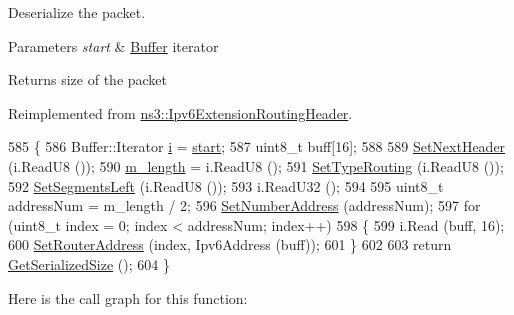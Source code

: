 Deserialize the packet. 


\begin{DoxyParams}{Parameters}
{\em start} & \hyperlink{classns3_1_1Buffer}{Buffer} iterator \\
\hline
\end{DoxyParams}
\begin{DoxyReturn}{Returns}
size of the packet 
\end{DoxyReturn}


Reimplemented from \hyperlink{classns3_1_1Ipv6ExtensionRoutingHeader_aa1084222d3efdae9d445ff8a5b00322a}{ns3\+::\+Ipv6\+Extension\+Routing\+Header}.


\begin{DoxyCode}
585 \{
586   Buffer::Iterator \hyperlink{bernuolliDistribution_8m_a6f6ccfcf58b31cb6412107d9d5281426}{i} = \hyperlink{namespacevisualizer_1_1core_a2a35e5d8a34af358b508dac8635754e0}{start};
587   uint8\_t buff[16];
588 
589   \hyperlink{classns3_1_1Ipv6ExtensionHeader_a750a50791b7710a151ea61dad7063256}{SetNextHeader} (i.ReadU8 ());
590   \hyperlink{classns3_1_1Ipv6ExtensionHeader_aebd490c06dfde17f84b92baa3349afc8}{m\_length} = i.ReadU8 ();
591   \hyperlink{classns3_1_1Ipv6ExtensionRoutingHeader_a227281f25a92273d206b284fea5ef410}{SetTypeRouting} (i.ReadU8 ());
592   \hyperlink{classns3_1_1Ipv6ExtensionRoutingHeader_ac5b62f0810ca16780c26d00f4da4b83f}{SetSegmentsLeft} (i.ReadU8 ());
593   i.ReadU32 ();
594 
595   uint8\_t addressNum = m\_length / 2;
596   \hyperlink{classns3_1_1Ipv6ExtensionLooseRoutingHeader_afbd5a9612a1eb9d45c5a5c6cf0eb746a}{SetNumberAddress} (addressNum);
597   \textcolor{keywordflow}{for} (uint8\_t index = 0; index < addressNum; index++)
598     \{
599       i.Read (buff, 16);
600       \hyperlink{classns3_1_1Ipv6ExtensionLooseRoutingHeader_aec81e612157334b09202d97083d44288}{SetRouterAddress} (index, Ipv6Address (buff));
601     \}
602 
603   \textcolor{keywordflow}{return} \hyperlink{classns3_1_1Ipv6ExtensionLooseRoutingHeader_afb2883ef629c9219b3e1d0e2936d9462}{GetSerializedSize} ();
604 \}
\end{DoxyCode}


Here is the call graph for this function\+:


